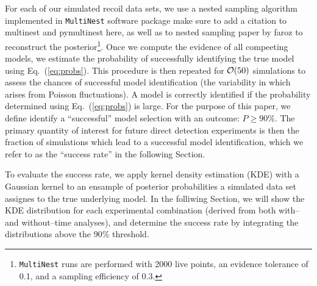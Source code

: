 \documentclass[11pt]{article}
\newcommand{\Eq}[1]{Eq.~(\ref{#1})} \newcommand{\Eqs}[2]{Eqs.~(\ref{#1}) and (\ref{#2})} \newcommand{\Eqm}[2]{Eqs.~(\ref{#1}) through (\ref{#2})}
\newcommand{\vgColor}{magenta}
\newcommand{\vg}[1]{{\color{\vgColor} #1}}
\begin{document}
For each of our simulated recoil data sets, we use a nested sampling algorithm implemented in \texttt{MultiNest} software package \cite{pymultinest,Feroz:2008xx} \vg{make sure to add a citation to multinest and pymultinest here, as well as to nested sampling paper by faroz} to reconstruct the posterior\footnote{\texttt{MultiNest} runs are performed with 2000 live points, an evidence tolerance of 0.1, and a sampling efficiency of 0.3.}. Once we compute the evidence of all compeeting models, we estimate the probability of successfully identifying the true model using \Eq{eq:probs}. This procedure is then repeated for ${\cal O}(50)$ simulations to assess the chances of successful model identification (the variability in which arises from Poisson fluctuations). A model is correctly identified if the probability determined using \Eq{eq:probs} is large. For the purpose of this paper, we define identify a ``successful'' model selection with an outcome: $P \geq 90\%$. The primary quantity of interest for future direct detection experiments is then the fraction of simulations which lead to a successful model identification, which we refer to as the ``success rate'' in the following Section.    

To evaluate the success rate, we apply kernel density estimation (KDE) with a Gaussian kernel to an ensample of posterior probabilities a simulated data set assignes to the true underlying model. In the folliwing Section, we will show the KDE distribution for each experimental combination (derived from both with-- and without--time analyses), and determine the success rate by integrating the distributions above the 90\% threshold. 
\end{document}
